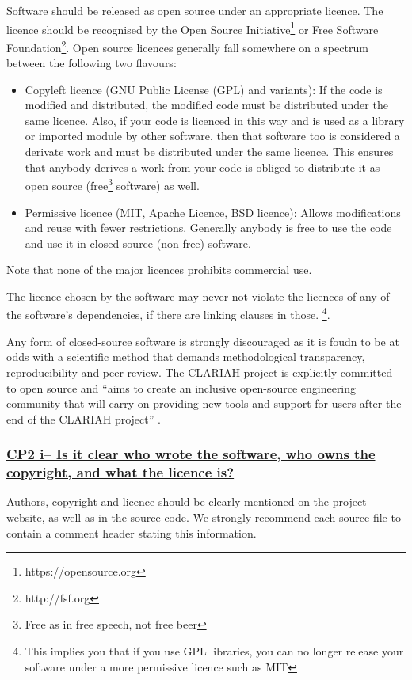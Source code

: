 \documentclass[a4paper,11pt]{article}
\newcommand{\criterion}[1]{\subsubsection*{\underline{#1}}}
\begin{document}
Software should be released as open source under an appropriate licence. The
licence should be recognised by the Open Source Initiative\footnote{https://opensource.org} or Free Software
Foundation\footnote{http://fsf.org}. Open source licences generally fall somewhere on a spectrum between the following two flavours:

\begin{itemize}
 \item Copyleft licence (GNU Public License (GPL) and variants): If the code is modified and distributed, the modified code must be distributed under the same licence. Also, if your code is licenced in this way and is used as a library or imported module by other software, then that software too is considered a derivate work and must be distributed under the same licence. This ensures that anybody derives a work from your code is obliged to distribute it as open source (free\footnote{Free as in free speech, not free beer} software) as well.
 \item Permissive licence (MIT, Apache Licence, BSD licence): Allows modifications and reuse with fewer restrictions. Generally anybody is free to use the code and use it in closed-source (non-free) software.
\end{itemize}

Note that none of the major licences prohibits commercial use.

The licence chosen by the software may never not violate the licences of any of
the software's dependencies, if there are linking clauses in those. \footnote{This implies you that if you use GPL libraries, you can no longer release your software under a more permissive licence such as MIT}.

Any form of closed-source software is strongly discouraged as it is foudn to be
at odds with a scientific method that demands methodological transparency,
reproducibility and peer review. The CLARIAH project is explicitly committed to
open source and ``aims to create an inclusive open-source engineering community
that will carry on providing new tools and support for users after the end of
the CLARIAH project'' \cite{CLARIAHTECHPLAN1}.


\criterion{CP2 i-- Is it clear who wrote the software, who owns the
copyright, and what the licence is?}

Authors, copyright and licence should be clearly mentioned on the project
website, as well as in the source code.  We strongly recommend each source file
to contain a comment header stating this information.
\end{document}
